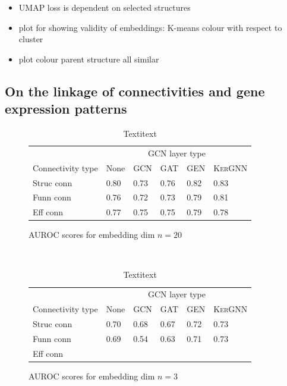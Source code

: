 \documentclass[]{article}
\begin{document}
\begin{itemize}
	\item UMAP loss is dependent on selected structures

	\item plot for showing validity of embeddings: K-means colour with respect to cluster 
	\item plot colour parent structure all similar
\end{itemize}





\subsection{On the linkage of connectivities and gene expression patterns}

\begin{table}
	\centering
	\renewcommand{\arraystretch}{1.2}
	\begin{subfigure}{1.\textwidth}
		\centering
		\begin{tabular}{l|l|l|l|l|l}
			\hline
			&\multicolumn{5}{c}{GCN layer type}\\
			Connectivity type&None&\textsc{GCN}&\textsc{GAT}&\textsc{GEN}&\textsc{KerGNN}\\
			\hline
			Struc conn&0.80&0.73&0.76&0.82&0.83\\
			Funn conn&0.76&0.72&0.73&0.79&0.81\\
			Eff conn&0.77&0.75&0.75&0.79&0.78\\		
		\end{tabular}
	
		\caption{AUROC scores for embedding dim $n=20$}
		\label{tab:results_connpred_20}
	\end{subfigure}\\

	\begin{subfigure}{1.0\textwidth}
		\hspace{0.5cm}
		\centering
		\begin{tabular}{l|l|l|l|l|l}
			\hline
			&\multicolumn{5}{c}{GCN layer type}\\
			Connectivity type&None&\textsc{GCN}&\textsc{GAT}&\textsc{GEN}&\textsc{KerGNN}\\
			\hline
			Struc conn&0.70&0.68&0.67&0.72&0.73\\
			Funn conn&0.69&0.54&0.63&0.71&0.73\\
			Eff conn&&&&&\\		
		\end{tabular}
		
		\caption{AUROC scores for embedding dim $n=3$}
		\label{tab:results_connpred_3}
	\end{subfigure}
	
	\caption{Textitext}
	\label{tab:conn_pred_GCN}
\end{table}
\end{document}
